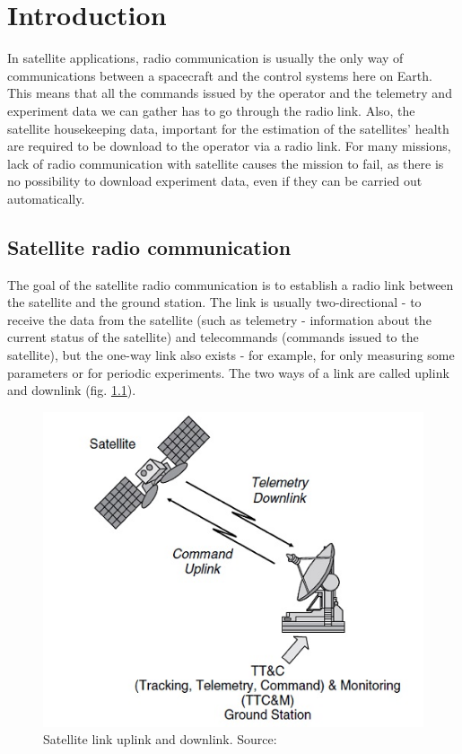 \chapter{Introduction}
In satellite applications, radio communication is usually the only way of communications between a spacecraft and the control systems here on Earth. This means that all the commands issued by the operator and the telemetry and experiment data we can gather has to go through the radio link. Also, the satellite housekeeping data, important for the estimation of the satellites' health are required to be download to the operator via a radio link. For many missions, lack of radio communication with satellite causes the mission to fail, as there is no possibility to download experiment data, even if they can be carried out automatically.

\section{Satellite radio communication}
The goal of the satellite radio communication is to establish a radio link between the satellite and the ground station. The link is usually two-directional - to receive the data from the satellite (such as telemetry - information about the current status of the satellite) and telecommands (commands issued to the satellite), but the one-way link also exists - for example, for only measuring some parameters or for periodic experiments. The two ways of a link are called uplink and downlink (fig. \ref{intro:uplink_downlink}). 
\begin{figure}[h]
    \centering
    \includegraphics[width=0.5\paperwidth]{img/2/uplink_downlink.jpg}
    \caption{Satellite link uplink and downlink. Source: \cite{satcom_decription}}
    \label{intro:uplink_downlink}
\end{figure}

